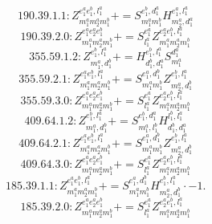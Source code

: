 \documentclass[letterpaper,10pt,fleqn,leqno,onecolumn]{article}
\begin{document}
\begin{equation} \;\;\;\;\;\;  190.39.1.1: Z^{e_{1}^{a}e_{1}^{b},l_{1}^{a}}_{m_{1}^{a}m_{2}^{a}m_{1}^{b}}+=S^{e_{1}^{b},d_{1}^{a}}_{m_{1}^{a}m_{1}^{b}}H^{e_{1}^{a},l_{1}^{a}}_{m_{2}^{a},d_{1}^{a}} \end{equation}
\begin{equation} \;\;\;\;\;\;  190.39.2.0: Z^{e_{1}^{a}e_{2}^{a}e_{1}^{b}}_{m_{1}^{a}m_{2}^{a}m_{1}^{b}}+=S^{e_{1}^{a}}_{l_{1}^{a}}Z^{e_{2}^{a}e_{1}^{b},l_{1}^{a}}_{m_{1}^{a}m_{2}^{a}m_{1}^{b}} \end{equation}
\begin{equation} \;\;\;\;\;\;  355.59.1.2: Z^{e_{1}^{b},l_{1}^{a}}_{m_{1}^{a},d_{1}^{b}}+=H^{e_{1}^{b},l_{1}^{a}}_{d_{1}^{b},d_{1}^{a}}S^{d_{1}^{a}}_{m_{1}^{a}} \end{equation}
\begin{equation} \;\;\;\;\;\;  355.59.2.1: Z^{e_{1}^{a}e_{1}^{b},l_{1}^{a}}_{m_{1}^{a}m_{2}^{a}m_{1}^{b}}+=S^{e_{1}^{a},d_{1}^{b}}_{m_{1}^{a}m_{1}^{b}}Z^{e_{1}^{b},l_{1}^{a}}_{m_{2}^{a},d_{1}^{b}} \end{equation}
\begin{equation} \;\;\;\;\;\;  355.59.3.0: Z^{e_{1}^{a}e_{2}^{a}e_{1}^{b}}_{m_{1}^{a}m_{2}^{a}m_{1}^{b}}+=S^{e_{1}^{a}}_{l_{1}^{a}}Z^{e_{2}^{a}e_{1}^{b},l_{1}^{a}}_{m_{1}^{a}m_{2}^{a}m_{1}^{b}} \end{equation}
\begin{equation} \;\;\;\;\;\;  409.64.1.2: Z^{e_{1}^{b},l_{1}^{a}}_{m_{1}^{a},d_{1}^{b}}+=S^{e_{1}^{b},d_{1}^{a}}_{m_{1}^{a},l_{1}^{b}}H^{l_{1}^{b},l_{1}^{a}}_{d_{1}^{b},d_{1}^{a}} \end{equation}
\begin{equation} \;\;\;\;\;\;  409.64.2.1: Z^{e_{1}^{a}e_{1}^{b},l_{1}^{a}}_{m_{1}^{a}m_{2}^{a}m_{1}^{b}}+=S^{e_{1}^{a},d_{1}^{b}}_{m_{1}^{a}m_{1}^{b}}Z^{e_{1}^{b},l_{1}^{a}}_{m_{2}^{a},d_{1}^{b}} \end{equation}
\begin{equation} \;\;\;\;\;\;  409.64.3.0: Z^{e_{1}^{a}e_{2}^{a}e_{1}^{b}}_{m_{1}^{a}m_{2}^{a}m_{1}^{b}}+=S^{e_{1}^{a}}_{l_{1}^{a}}Z^{e_{2}^{a}e_{1}^{b},l_{1}^{a}}_{m_{1}^{a}m_{2}^{a}m_{1}^{b}} \end{equation}
\begin{equation} \;\;\;\;\;\;  185.39.1.1: Z^{e_{1}^{a}e_{1}^{b},l_{1}^{a}}_{m_{1}^{a}m_{2}^{a}m_{1}^{b}}+=S^{e_{1}^{a},d_{1}^{b}}_{m_{1}^{a}m_{1}^{b}}H^{e_{1}^{b},l_{1}^{a}}_{m_{2}^{a},d_{1}^{b}}\cdot -1. \end{equation}
\begin{equation} \;\;\;\;\;\;  185.39.2.0: Z^{e_{1}^{a}e_{2}^{a}e_{1}^{b}}_{m_{1}^{a}m_{2}^{a}m_{1}^{b}}+=S^{e_{1}^{a}}_{l_{1}^{a}}Z^{e_{2}^{a}e_{1}^{b},l_{1}^{a}}_{m_{1}^{a}m_{2}^{a}m_{1}^{b}} \end{equation}
\end{document}
